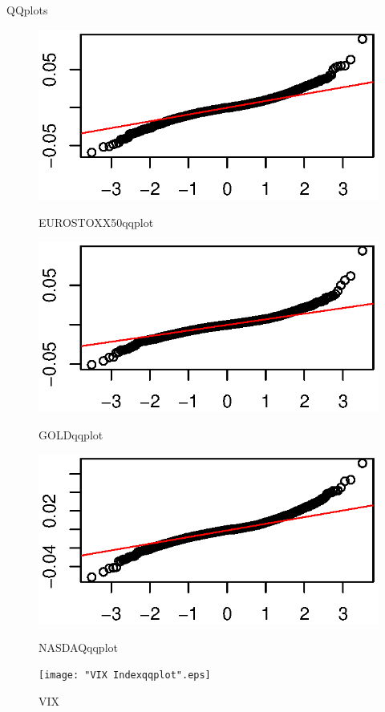 \documentclass{beamer}
\begin{document}
\begin{frame}{QQplots}
	\begin{figure}[h] \label{}
		\begin{minipage}[b]{0.40\linewidth}
			\centering
			\includegraphics[width=1\linewidth]{EUROSTOXX50qqplot.eps}
			\caption{EUROSTOXX50qqplot}
		\end{minipage} \begin{minipage}[b]{0.40\linewidth}
			\centering
			\includegraphics[width=1\linewidth]{GOLDqqplot.eps}
			\caption{GOLDqqplot}
		\end{minipage} \begin{minipage}[b]{0.40\linewidth}
			\centering
			\includegraphics[width=1\linewidth]{NASDAQqqplot.eps}
			\caption{NASDAQqqplot}
		\end{minipage}\hfill
		\begin{minipage}[b]{0.40\linewidth}
			\centering
			\texttt{[image: "VIX Indexqqplot".eps]}
			\caption{VIX}
		\end{minipage}
	\end{figure}
	
\end{frame}
\end{document}
